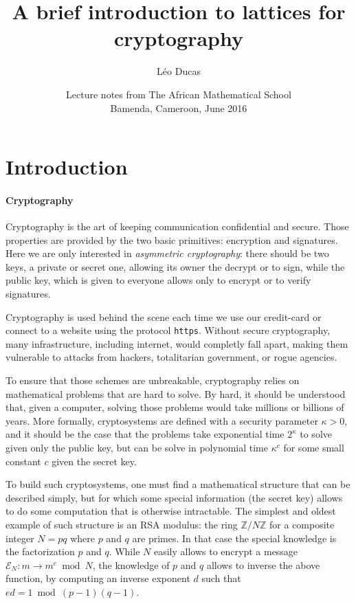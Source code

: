 \documentclass[12pt]{article}
\title{A brief introduction to lattices  for cryptography}
\author{L\'eo Ducas}
\date{Lecture notes from The African Mathematical School \\ Bamenda, Cameroon, June 2016}
\newcommand{\Z}{\mathbb Z}
\begin{document}
\maketitle

\section{Introduction}

\paragraph{Cryptography}

Cryptography is the art of keeping communication confidential and secure. Those properties are provided by the two basic primitives: encryption and signatures. Here we are only interested in {\em asymmetric cryptography}: there should be two keys, a private or secret one, allowing its owner the decrypt or to sign, while the public key, which is given to everyone allows only to encrypt or to verify signatures.

Cryptography is used behind the scene each time we use our credit-card or connect to a website using the protocol \texttt{https}. Without secure cryptography, many infrastructure, including internet, would completly fall apart, making them vulnerable to attacks from hackers, totalitarian government, or rogue agencies.

To ensure that those schemes are unbreakable, cryptography relies on mathematical problems that are hard to solve. By hard, it should be understood that, given a computer, solving those problems would take millions or billions of years. More formally, cryptosystems are defined with a security parameter $\kappa > 0$, and it should be the case that the problems take exponential time $2^\kappa$ to solve given only the public key, but can be solve in polynomial time $\kappa^c$ for some small constant $c$ given the secret key.

To build such cryptosystems, one must find a mathematical structure that can be described simply, but for which some special information (the secret key) allows to do some computation that is otherwise intractable. The simplest and oldest example of such structure is an RSA modulus: the ring $\Z / N\Z$ for a composite integer $N = pq$ where $p$ and $q$ are primes. In that case the special knowledge is the factorization $p$ and $q$. While $N$ easily allows to encrypt a message $\mathcal E_N : m \rightarrow m^e \bmod N$, the knowledge of $p$ and $q$ allows to inverse the above function, by computing an inverse exponent $d$ such that $ed = 1 \bmod (p-1)(q-1)$.
\end{document}
